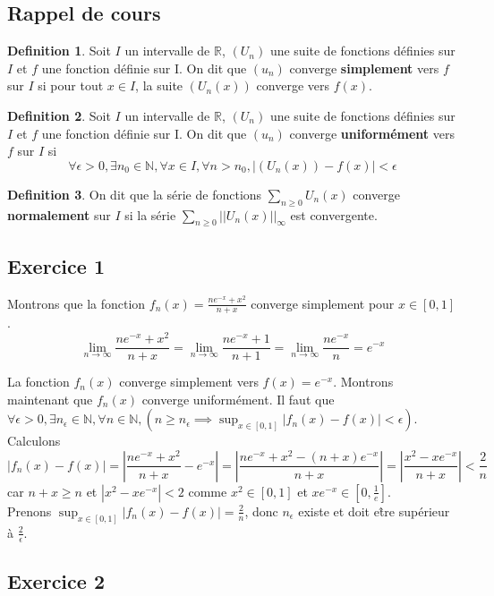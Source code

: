 \documentclass[]{book}
\theoremstyle{definition}
\newtheorem{defn}{Definition}
\newcommand{\bb}[1]{\mathbb{#1}}
\newcommand{\R}{\bb{R}}
\newcommand{\N}{\bb{N}}
\begin{document}
\subsection*{Rappel de cours}
\begin{defn}
Soit $I$ un intervalle de $\R$,  $(U_n)$ une suite de fonctions d\'efinies sur $I$ et $f$ une fonction d\'efinie sur I.
On dit que $(u_n)$ converge \textbf{simplement} vers $f$ sur $I$ si pour tout $x \in I$, la suite $(U_n(x))$ converge vers $f(x)$.
\end{defn}

\begin{defn}
Soit $I$ un intervalle de $\R$,  $(U_n)$ une suite de fonctions d\'efinies sur $I$ et $f$ une fonction d\'efinie sur I.
On dit que $(u_n)$ converge \textbf{uniform\'ement} vers $f$ sur $I$ si
$$\forall \epsilon > 0, \exists n_0 \in \N, \forall x \in I, \forall n > n_0, |(U_n(x)) - f(x)| < \epsilon$$
\end{defn}

\begin{defn}
On dit que la s\'erie de fonctions $\sum_{n\geq0}U_n(x)$ converge \textbf{normalement} sur  $I$ si la s\'erie $\sum_{n\geq0}||U_n(x)||_{\infty}$ est convergente.
 \end{defn}


\newpage
\subsection*{Exercice 1}
Montrons que la fonction $f_n(x)=\frac{ne^{-x}+x^2}{n+x}$ converge simplement pour $x \in [0,1]$.
$$\lim_{n \to \infty}\frac{ne^{-x}+x^2}{n+x} = \lim_{n \to \infty}\frac{ne^{-x}+1}{n+1} = \lim_{n \to \infty}\frac{ne^{-x}}{n} = e^{-x}$$

La fonction $f_n(x)$ converge simplement vers $f(x) = e^{-x}$. Montrons maintenant que $f_n(x)$ converge uniform\'ement. Il faut que $\forall \epsilon > 0, \exists n_{\epsilon} \in \N, \forall n \in \N, (n \geq n_{\epsilon} \implies \sup_{x \in [0,1]} |f_n(x)-f(x)| < \epsilon)$.
Calculons 
$$|f_n(x)-f(x)| = \left|\frac{ne^{-x}+x^2}{n+x} - e^{-x}\right| = \left|\frac{ne^{-x}+x^2-(n+x)e^{-x}}{n+x}\right| = \left|\frac{x^2-xe^{-x}}{n+x}\right| < \frac{2}{n}$$
car $n+x \geq n$ et $|x^2-xe^{-x}| < 2$ comme $x^2 \in [0,1]$ et $xe^{-x} \in [0, \frac{1}{e}]$.\\ 
Prenons $\sup_{x \in [0,1]} |f_n(x)-f(x)| = \frac{2}{n}$, donc $n_{\epsilon}$ existe et doit e\^tre sup\'erieur \`a $\frac{2}{\epsilon}$.


\subsection*{Exercice 2}
\end{document}
